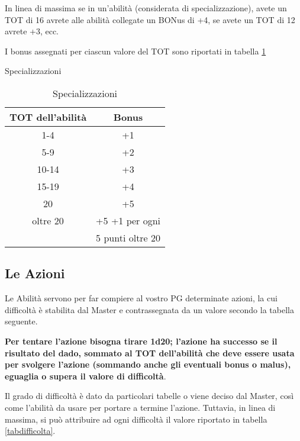 In linea di massima se in un'abilit\`a (considerata di
specializzazione), avete un TOT di 16 avrete alle abilit\`a
collegate un BONus di +4, se avete un TOT di 12 avrete +3, ecc.

I bonus assegnati per ciascun valore del TOT sono riportati in tabella
\ref{tabspecializzazioni}

\begin{table}[hbt]
\centering

{\Large\sc Specializzazioni\medskip}

\begin{tabular}{|c|c|}
\hline
TOT dell'abilit\`a& Bonus \\ \hline\hline
1-4&+1\\ \hline
5-9& +2\\ \hline
10-14& +3\\ \hline
15-19& +4\\ \hline
20& +5\\ \hline
oltre 20& +5 +1 per ogni \\
&5 punti oltre 20 \\ \hline
\end{tabular}
\caption{Specializzazioni}
\label{tabspecializzazioni}
\end{table}

\subsection{Le Azioni}
\label{azioni}
Le Abilit\`a servono per far compiere al vostro PG determinate
azioni, la cui difficolt\`a \`e stabilita dal Master e
contrassegnata da un valore secondo la tabella seguente. 

\textbf{Per tentare l'azione bisogna tirare 1d20; l'azione ha successo se il
risultato del dado, sommato al TOT dell'abilit\`a che deve essere
usata per svolgere l'azione (sommando anche gli eventuali bonus o
malus), eguaglia o supera il valore di difficolt\`a}. 

Il grado di difficolt\`a \`e dato da particolari tabelle o viene
deciso dal Master, cos\`i come l'abilit\`a da usare per portare a
termine l'azione. Tuttavia, in linea di massima, si pu\`o attribuire ad
ogni difficolt\`a il valore riportato in tabella \ref{tabdifficolta}.

